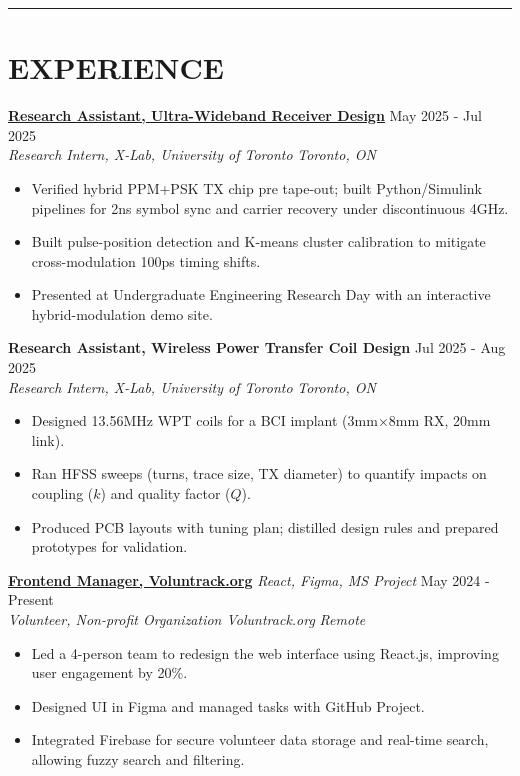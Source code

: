 \documentclass[letterpaper,10pt]{article}
\begin{document}
\noindent\rule{\linewidth}{1pt}

\section*{\textbf{EXPERIENCE}}

\noindent\href{https://github.com/Ken-2511/ppm-psk-visualize}
{\uline{\textbf{Research Assistant, Ultra-Wideband Receiver Design}}} \hfill May 2025 - Jul 2025\\
\textit{Research Intern, X-Lab, University of Toronto} \hfill \textit{Toronto, ON}
\begin{itemize}[leftmargin=0.2in]
    \item Verified hybrid PPM+PSK TX chip pre tape-out; built Python/Simulink pipelines for 2ns symbol sync and carrier recovery under discontinuous 4GHz.
	\item Built pulse-position detection and K-means cluster calibration to mitigate cross-modulation 100ps timing shifts.
    \item Presented at Undergraduate Engineering Research Day with an interactive hybrid-modulation demo site.
\end{itemize}

\vspace{0.3cm}
\noindent\textbf{Research Assistant, Wireless Power Transfer Coil Design} \hfill Jul 2025 - Aug 2025\\
\textit{Research Intern, X-Lab, University of Toronto} \hfill \textit{Toronto, ON}
\begin{itemize}[leftmargin=0.2in]
    \item Designed 13.56MHz WPT coils for a BCI implant (3mm×8mm RX, 20mm link).
    \item Ran HFSS sweeps (turns, trace size, TX diameter) to quantify impacts on coupling ($k$) and quality factor ($Q$).
    \item Produced PCB layouts with tuning plan; distilled design rules and prepared prototypes for validation.
\end{itemize}


\vspace{0.3cm}
\noindent\href{https://volun-track.web.app}{\uline{
\textbf{Frontend Manager, Voluntrack.org}}} \textit{React, Figma, MS Project} \hfill May 2024 - Present\\
\textit{Volunteer, Non-profit Organization Voluntrack.org} \hfill \textit{Remote}
\begin{itemize}[leftmargin=0.2in]
    \item Led a 4-person team to redesign the web interface using React.js, improving user engagement by 20\%.
    \item Designed UI in Figma and managed tasks with GitHub Project.
    \item Integrated Firebase for secure volunteer data storage and real-time search, allowing fuzzy search and filtering.
\end{itemize}
\end{document}

